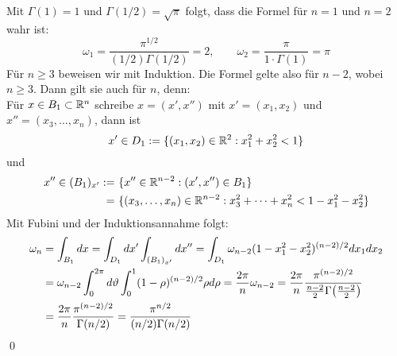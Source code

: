 	Mit $\Gamma(1) = 1$ und $\Gamma(1/2) = \sqrt{\pi}$ folgt, dass die Formel für $n=1$ und $n=2$ wahr ist:
	\[ \omega_1 = \frac{\pi^{1/2}}{(1/2)\Gamma(1/2)} = 2, \qquad \omega_2= \frac{\pi}{1 \cdot \Gamma(1)} = \pi \]
	Für $n \geq 3$ beweisen wir mit Induktion. Die Formel gelte also für $n - 2$, wobei $n \geq 3$. Dann gilt sie auch für $n$, denn: \\
	Für $x \in B_1 \subset \mathbb{R}^n$ schreibe $x = (x',x'')$ mit $x' = (x_1,x_2)$ und $x'' = (x_3,\dots,x_n)$, dann ist
	\[ x' \in D_1 := \{(x_1,x_2) \in \mathbb{R}^2 : x_1^2 + x_2^2 < 1 \} \]
	und
	\begin{equation}
	\begin{aligned}
		x'' \in (B_1)_{x'} := \ &\{x'' \in \mathbb{R}^{n-2} : (x',x'') \in B_1 \} \\ \notag
			= \ &\{(x_3,\dots,x_n) \in \mathbb{R}^{n-2} : x_3^2 + \dots + x_n^2 < 1 - x_1^2 - x_2^2 \}
	\end{aligned}
	\end{equation}
	Mit Fubini und der Induktionsannahme folgt:
	\begin{equation}
	\begin{aligned}
		\omega_n &= \int_{B_1} dx = \int_{D_1} dx' \int_{(B_1)_{x'}} dx'' 
			= \int_{D_1} \omega_{n-2} (1-x_1^2-x_2^2)^{(n-2)/2} dx_1 dx_2 \\
			&= \omega_{n-2} \int_0^{2\pi} d \vartheta \int_0^1 (1-\rho)^{(n-2)/2} \rho d\rho 
			= \frac{2\pi}{n} \omega_{n-2} = \frac{2\pi}{n} \frac{\pi^{(n-2)/2}}{\frac{n-2}{2} \Gamma \enbrace*{ \frac{n-2}{2}}} \\
			&= \frac{2\pi}{n} \frac{\pi^{(n-2)/2}}{\Gamma(n/2)} = \frac{\pi^{n/2}}{(n/2) \Gamma (n/2)} \notag
	\end{aligned}
	\end{equation}
	\qed
\newpage